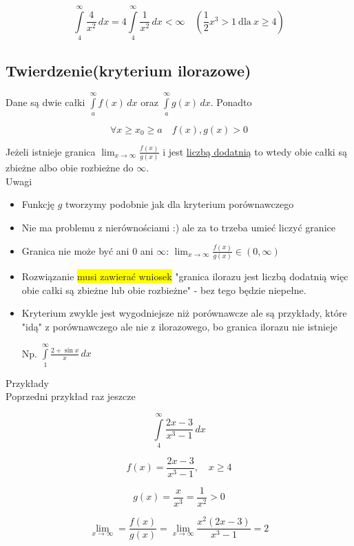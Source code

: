 $$ \int\limits_4^\infty \frac{4}{x^2} \,dx = 4 \int\limits_4^\infty \frac{1}{x^2} \,dx < \infty
\quad \left(\frac{1}{2}x^3 > 1 \ \mathrm{dla} \ x \geq 4 \right) $$


\subsection*{Twierdzenie(kryterium ilorazowe)}

Dane są dwie całki $ \int\limits_a^\infty f(x) \,dx $ oraz $ \int\limits_{a}^{\infty} g(x) \,dx $. Ponadto

$$ \forall x \geq x_0 \geq a \quad f(x), g(x) > 0 $$

Jeżeli istnieje granica $ \lim_{x \to \infty} \frac{f(x)}{g(x)} $ i jest \underline{liczbą dodatnią} to wtedy obie całki
są zbieżne albo obie rozbieżne do $\infty$. \\

Uwagi
\begin{itemize}
    \item Funkcję $g$ tworzymy podobnie jak dla kryterium porównawczego
    \item Nie ma problemu z nierównościami :) ale za to trzeba umieć liczyć granice
    \item Granica nie może być ani 0 ani $\infty$: $ \lim_{x \to \infty} \frac{f(x)}{g(x)} \in (0, \infty) $
    \item Rozwiązanie \colorbox{yellow}{musi zawierać wniosek} "granica ilorazu jest liczbą dodatnią więc obie całki
    są zbieżne lub obie rozbieżne" - bez tego będzie niepełne.
    \item Kryterium zwykle jest wygodniejsze niż porównawcze ale są przykłady, które "idą" z porównawczego ale nie z
    ilorazowego, bo granica ilorazu nie istnieje

    Np. $ \int\limits_{1}^{\infty} \frac{2 + \sin x}{x} \,dx $
\end{itemize}

Przykłady \\

Poprzedni przykład raz jeszcze 

$$ \int\limits_4^\infty \frac{2x - 3}{x^3 - 1} \,dx $$

$$ f(x) = \frac{2x - 3}{x^3 - 1}, \quad x \geq 4 $$

$$ g(x) = \frac{x}{x^3} = \frac{1}{x^2} > 0 $$

$$ \lim_{x \to \infty} = \frac{f(x)}{g(x)} = \lim_{x \to \infty} \frac{x^2(2x - 3)}{x^3 - 1} = 2 $$

